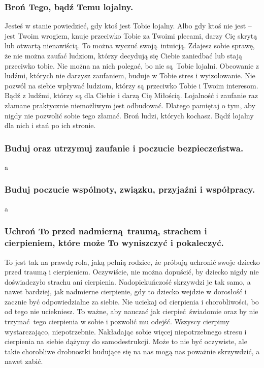 \subsubsection{Broń Tego, bądź Temu lojalny.}
Jesteś w stanie powiedzieć, gdy ktoś jest Tobie lojalny.
Albo gdy ktoś nie jest -- jest Twoim wrogiem, knuje przeciwko Tobie za Twoimi plecami, darzy Cię skrytą lub otwartą nienawiścią.
To można wyczuć swoją intuicją.
Zdajesz sobie sprawę, że nie można zaufać ludziom, którzy decydują się Ciebie zaniedbać lub stają przeciwko tobie.
Nie można na nich polegać, bo nie są Tobie lojalni.
Obcowanie z ludźmi, których nie darzysz zaufaniem, buduje w Tobie stres i wyizolowanie.
Nie pozwól na siebie wpływać ludziom, którzy są przeciwko Tobie i Twoim interesom.
Bądź z ludźmi, którzy są dla Ciebie i darzą Cię Miłością.
Lojalność i zaufanie raz złamane praktycznie niemożliwym jest odbudować.
Dlatego pamiętaj o tym, aby nigdy nie pozwolić sobie tego złamać.
Broń ludzi, których kochasz.
Bądź lojalny dla nich i stań po ich stronie.

\subsubsection{Buduj oraz utrzymuj zaufanie i poczucie bezpieczeństwa.}
a 
\subsubsection{Buduj poczucie wspólnoty, związku, przyjaźni i współpracy.}
a 
\subsubsection{Uchroń To przed nadmierną traumą, strachem i cierpieniem, które może To wyniszczyć i pokaleczyć.}
To jest tak na prawdę rola, jaką pełnią rodzice, że próbują uchronić swoje dziecko przed traumą i cierpieniem.
Oczywiście, nie można dopuścić, by dziecko nigdy nie doświadczyło strachu ani cierpienia.
Nadopiekuńczość skrzywdzi je tak samo, a nawet bardziej, jak nadmierne cierpienie, gdy to dziecko wejdzie w dorosłość i zacznie być odpowiedzialne za siebie.
Nie uciekaj od cierpienia i chorobliwości, bo od tego nie uciekniesz.
To ważne, aby nauczać jak cierpieć świadomie oraz by nie trzymać tego cierpienia w sobie i pozwolić mu odejść.
Wszyscy cierpimy wystarczająco, niepotrzebnie.
Nakładając sobie więcej niepotrzebnego stresu i cierpienia na siebie dążymy do samodestrukcji.
Może to nie być oczywiste, ale takie chorobliwe drobnostki budujące się na nas mogą nas poważnie skrzywdzić, a nawet zabić.

